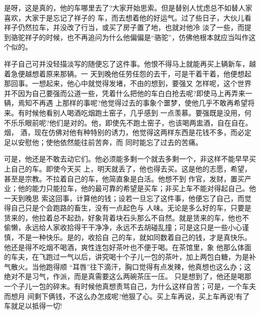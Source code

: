 \documentclass[11pt,a4paper,onecolumn]{article}
\begin{document}
是呀，这是真的，他的车哪里去了?大家开始思索。但是替别人忧虑总不如替人家喜欢，大家于是忘记了祥子的
车，而去想着他的好运气。过了些日子，大伙儿看祥子仍然拉车，并没改了行当，或买了房子置了地，也就对他冷
淡了一些，而提到骆驼祥子的时候，也不再追问为什么他偏偏是``骆驼''，仿佛他根本就应当叫作这个似的。

祥子自己可并没轻描淡写的随便忘了这件事。他恨不得马上就能再买上辆新车，越着急便越想着原来那辆。一
天到晚他任劳任怨的去干，可是干着干着，他便想起那回事。一想起来，他心中就觉得发堵，不由的想到，要强又
怎样呢，这个世界并不因为自己要强而公道一些，凭着什么把他的车白白抢去呢?即使马上再弄来一辆，焉知不再遇
上那样的事呢?他觉得过去的事象个噩梦，使他几乎不敢再希望将来。有时候他看别人喝酒吃烟跑土窑子，几乎感到
一点羡慕。要强既是没用，何不乐乐眼前呢?他们是对的。他，即使先不跑土窑子，也该喝两盅酒，自在自在。烟，
酒，现在仿佛对他有种特别的诱力，他觉得这两样东西是花钱不多，而必定足以安慰他；使他依然能往前苦奔，而
同时能忘了过去的苦痛。

可是，他还是不敢去动它们。他必须能多剩一个就去多剩一个，非这样不能早早买上自己的车。即使今天买
上，明天就丢了，他也得去买。这是他的志愿，希望，甚至是宗教。不拉着自己的车，他简直象是白活。他想不到
作官，发财，置买产业；他的能力只能拉车，他的最可靠的希望是买车；非买上车不能对得起自己。他一天到晚思
索这回事，计算他的钱；设若一旦忘了这件事，他便忘了自己，而觉得自己只是个会跑路的畜生，没有一点起色与
人味。无论是多么好的车，只要是赁来的，他拉着总不起劲，好象背着块石头那么不自然。就是赁来的车，他也不
偷懒，永远给人家收拾得干干净净，永远不去胡碰乱撞；可是这只是一些小心谨慎，不是一种快乐。是的，收拾自
己的车，就如同数着自己的钱，才是真快乐。他还是得不吃烟不喝酒，爽性连包好茶叶也不便于喝。在茶馆里，象
他那么体面的车夫，在飞跑过一气以后，讲究喝十个子儿一包的茶叶，加上两包白糖，为是补气散火。当他跑得顺
``耳唇''往下滴汗，胸口觉得有点发辣，他真想也这么办；这绝对不是习气，作派，而是真需要这么两碗茶压一压。
只是想到了，他还是喝那一个子儿一包的碎末。有时候他真想责骂自己，为什么这样自苦；可是，一个车夫而想月
间剩下俩钱，不这么办怎成呢?他狠了心。买上车再说，买上车再说!有了车就足以抵得一切!
\end{document}
